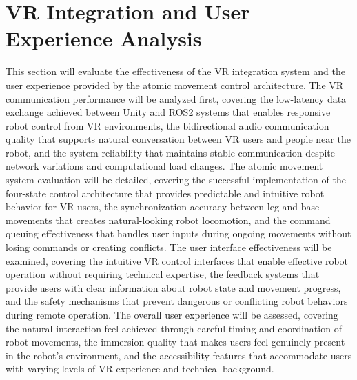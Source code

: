 \section{VR Integration and User Experience Analysis}
This section will evaluate the effectiveness of the VR integration system and the user experience provided by the atomic movement control architecture. The VR communication performance will be analyzed first, covering the low-latency data exchange achieved between Unity and ROS2 systems that enables responsive robot control from VR environments, the bidirectional audio communication quality that supports natural conversation between VR users and people near the robot, and the system reliability that maintains stable communication despite network variations and computational load changes. The atomic movement system evaluation will be detailed, covering the successful implementation of the four-state control architecture that provides predictable and intuitive robot behavior for VR users, the synchronization accuracy between leg and base movements that creates natural-looking robot locomotion, and the command queuing effectiveness that handles user inputs during ongoing movements without losing commands or creating conflicts. The user interface effectiveness will be examined, covering the intuitive VR control interfaces that enable effective robot operation without requiring technical expertise, the feedback systems that provide users with clear information about robot state and movement progress, and the safety mechanisms that prevent dangerous or conflicting robot behaviors during remote operation. The overall user experience will be assessed, covering the natural interaction feel achieved through careful timing and coordination of robot movements, the immersion quality that makes users feel genuinely present in the robot's environment, and the accessibility features that accommodate users with varying levels of VR experience and technical background.

